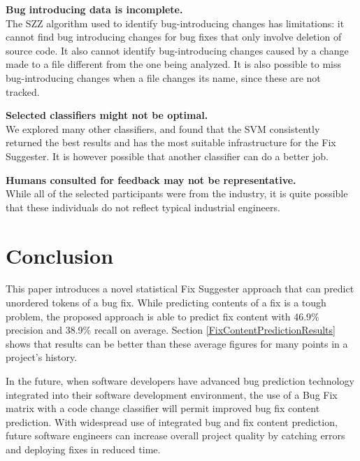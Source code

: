 \documentclass[10pt, conference, letterpaper, compsocconf]{IEEEtran}
\begin{document}
\par \textbf{Bug introducing data is incomplete.} \\ The SZZ algorithm used to identify bug-introducing
changes has limitations: it cannot find bug introducing changes for bug fixes that only involve deletion of source code.
It also cannot identify bug-introducing changes caused by a change made to a file different from the one being analyzed. It is also possible to miss bug-introducing changes when a file changes its name, since these are not tracked.

\par \textbf{Selected classifiers might not be optimal.} \\ We explored many
other classifiers, and found that the SVM consistently returned the
best results and has the most suitable infrastructure for the Fix Suggester. It is however possible that another classifier can do a better job.

\par \textbf{Humans consulted for feedback may not be representative.} \\ While all of the selected participants were from the industry, it is quite possible that these individuals do not reflect typical industrial engineers.

\section{Conclusion}
\par This paper introduces a novel statistical Fix Suggester approach that can predict unordered tokens of a bug fix. While predicting contents of a fix is a tough problem, the proposed approach is able to predict fix content with 46.9\% precision and 38.9\% recall on average. Section \ref{FixContentPredictionResults} shows that results can be better than these average figures for many points in a project's history.

\par In the future, when software developers have advanced bug prediction technology
integrated into their software development environment, the use of a Bug Fix matrix with a code change classifier will permit improved bug fix content prediction. With
widespread use of integrated bug and fix content prediction, future software engineers can
increase overall project quality by catching errors and deploying fixes in reduced time.





 
\end{document}
